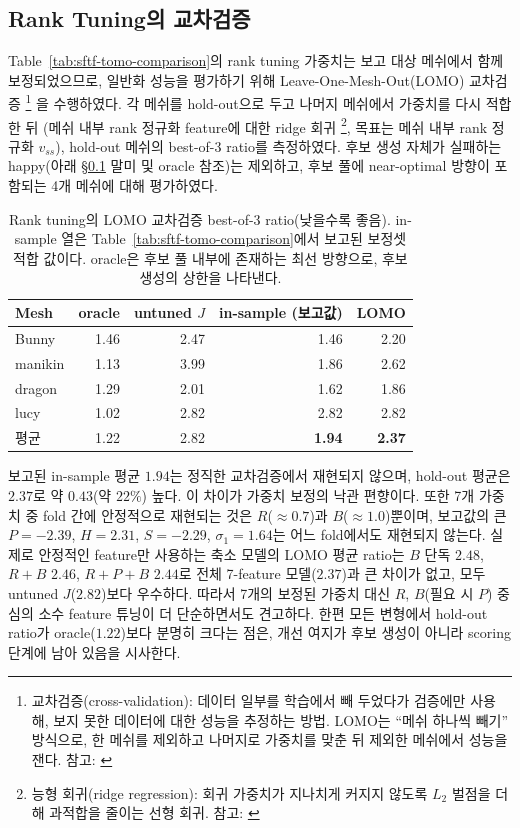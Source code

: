 \documentclass[11pt,a4paper]{article}
\begin{document}
\subsection{Rank Tuning의 교차검증}
\label{sec:cv}

Table~\ref{tab:sftf-tomo-comparison}의 rank tuning 가중치는 보고 대상 메쉬에서 함께 보정되었으므로,
일반화 성능을 평가하기 위해 Leave-One-Mesh-Out(LOMO) 교차검증%
\footnote{교차검증(cross-validation): 데이터 일부를 학습에서 빼 두었다가 검증에만 사용해, 보지 못한
데이터에 대한 성능을 추정하는 방법. LOMO는 ``메쉬 하나씩 빼기'' 방식으로, 한 메쉬를 제외하고
나머지로 가중치를 맞춘 뒤 제외한 메쉬에서 성능을 잰다. 참고: \cite{stone1974}}
을 수행하였다.
각 메쉬를 hold-out으로 두고 나머지 메쉬에서 가중치를 다시 적합한 뒤
(메쉬 내부 rank 정규화 feature에 대한 ridge 회귀%
\footnote{능형 회귀(ridge regression): 회귀 가중치가 지나치게 커지지 않도록 $L_2$ 벌점을 더해
과적합을 줄이는 선형 회귀. 참고: \cite{hoerl1970}}, 목표는 메쉬 내부 rank 정규화 $v_{ss}$),
hold-out 메쉬의 best-of-3 ratio를 측정하였다.
후보 생성 자체가 실패하는 happy(아래 \S\ref{sec:cv} 말미 및 oracle 참조)는 제외하고,
후보 풀에 near-optimal 방향이 포함되는 4개 메쉬에 대해 평가하였다.

\begin{table}[H]
\centering
\caption{Rank tuning의 LOMO 교차검증 best-of-3 ratio(낮을수록 좋음).
in-sample 열은 Table~\ref{tab:sftf-tomo-comparison}에서 보고된 보정셋 적합 값이다.
oracle은 후보 풀 내부에 존재하는 최선 방향으로, 후보 생성의 상한을 나타낸다.}
\label{tab:lomo-cv}
\begin{tabular}{lrrrr}
\toprule
Mesh & oracle & untuned $J$ & in-sample (보고값) & LOMO\\
\midrule
Bunny    & 1.46 & 2.47 & 1.46 & 2.20\\
manikin  & 1.13 & 3.99 & 1.86 & 2.62\\
dragon   & 1.29 & 2.01 & 1.62 & 1.86\\
lucy     & 1.02 & 2.82 & 2.82 & 2.82\\
\midrule
평균     & 1.22 & 2.82 & \textbf{1.94} & \textbf{2.37}\\
\bottomrule
\end{tabular}
\end{table}

보고된 in-sample 평균 $1.94$는 정직한 교차검증에서 재현되지 않으며,
hold-out 평균은 $2.37$로 약 $0.43$(약 $22\%$) 높다. 이 차이가 가중치 보정의 낙관 편향이다.
또한 7개 가중치 중 fold 간에 안정적으로 재현되는 것은 $R$($\approx 0.7$)과 $B$($\approx 1.0$)뿐이며,
보고값의 큰 $P=-2.39$, $H=2.31$, $S=-2.29$, $\sigma_1=1.64$는 어느 fold에서도 재현되지 않는다.
실제로 안정적인 feature만 사용하는 축소 모델의 LOMO 평균 ratio는
$B$ 단독 $2.48$, $R+B$ $2.46$, $R+P+B$ $2.44$로 전체 7-feature 모델($2.37$)과 큰 차이가 없고,
모두 untuned $J$($2.82$)보다 우수하다.
따라서 7개의 보정된 가중치 대신 $R$, $B$(필요 시 $P$) 중심의 소수 feature 튜닝이 더 단순하면서도 견고하다.
한편 모든 변형에서 hold-out ratio가 oracle($1.22$)보다 분명히 크다는 점은,
개선 여지가 후보 생성이 아니라 scoring 단계에 남아 있음을 시사한다.
\end{document}
